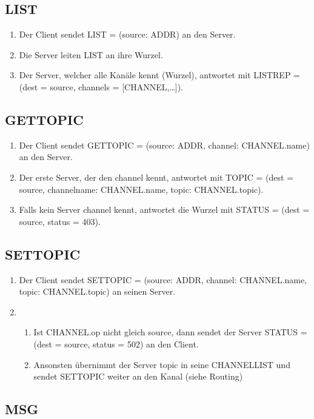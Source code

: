 \documentclass{article}
\begin{document}
\subsection{LIST}

\begin{enumerate}
  \item Der Client sendet LIST = (source: ADDR) an den Server.
  \item Die Server leiten LIST an ihre Wurzel. 
  \item Der Server, welcher alle Kanäle kennt (Wurzel), antwortet mit LISTREP = (dest = source, channels = [CHANNEL,\ldots]).
\end{enumerate}

\subsection{GETTOPIC}

\begin{enumerate}
  \item Der Client sendet GETTOPIC = (source: ADDR, channel: CHANNEL.name) an den Server.
  \item Der erste Server, der den channel kennt, antwortet mit TOPIC = (dest = source, channelname: CHANNEL.name, topic: CHANNEL.topic).
  \item Falls kein Server channel kennt, antwortet die Wurzel mit STATUS = (dest = source, status = 403).
\end{enumerate}

\subsection{SETTOPIC}

\begin{enumerate}
  \item Der Client sendet SETTOPIC = (source: ADDR, channel: CHANNEL.name, topic: CHANNEL.topic) an seinen Server.
  \item
    \begin{enumerate}
      \item Ist CHANNEL.op nicht gleich source, dann sendet der Server STATUS = (dest = source, status = 502) an den Client.
      \item Ansonsten übernimmt der Server topic in seine CHANNELLIST und sendet SETTOPIC weiter an den Kanal (siehe Routing)
    \end{enumerate}
\end{enumerate}

\subsection{MSG}
\end{document}
